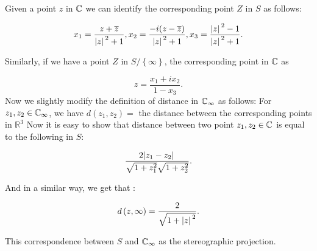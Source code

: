 Given a point $z$ in $\mathbb{C}$  we can identify the corresponding point $Z$ in $S$ as follows:


\[
	x_1 = \frac{z + \overline{z}}{\abs{z}^2 +1}, x_2= \frac{-i(z - \overline{z})}{\abs{z}^2 +1}, x_3 =  \frac{\abs{z}^2 -1}{\abs{z}^2 +1}
.\] 

Similarly, if we have a point $Z$ in $S / \left\{ \infty \right\} $, the corresponding point in $\mathbb{C}$ as 

\[
z = \frac{x_1 + i x_2}{1-x_3}
.\]
Now we slightly modify the definition of distance in $\mathbb{C}_\infty$ as follows: For $z_1, z_2  \in  \mathbb{C}_\infty$, we have $d(z_1,z_2) = $ the distance between the corresponding points in $\mathbb{R}^3$
Now it is easy to show that distance between two point $z_1, z_2 \in \mathbb{C}$ is equal to the following in $S$:

\[
	\frac{2 \abs{z_1 - z_2}}{\sqrt{1 + z_1^2} \sqrt{1 + z_2^2}} 
.\]

And in a similar way, we get that :

\[
	d\left( z, \infty \right)  =  \frac{2}{\sqrt{1+\abs{z}^2} }
.\]

This correspondence between $S$ and $\mathbb{C}_\infty$ as the stereographic projection.

